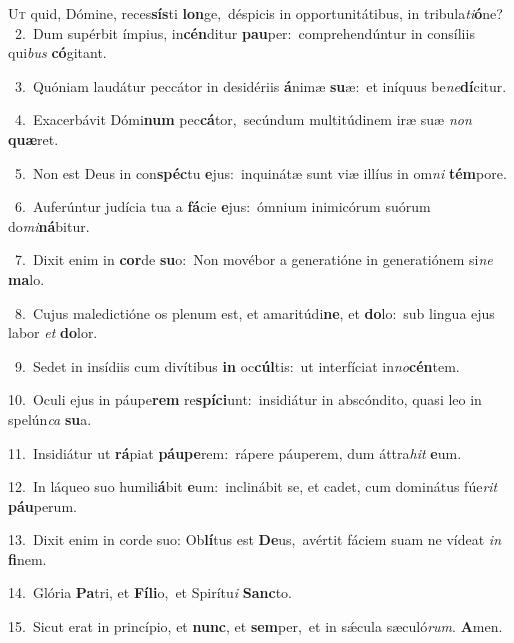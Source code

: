 \lettrine{\initial\textcolor{\initialcolor}{U}}{t} quid, Dómine, reces\-\textbf{sís}\-ti \textbf{lon}\-ge,~\star déspicis in opportunitátibus, in tribula\-\textit{ti}\-\textbf{ó}ne?\\
{\numbfont\textcolor{\numbcolor}{~2.}}~Dum supérbit ímpius, in\-\textbf{cén}\-ditur \textbf{pau}\-per:~\star comprehendúntur in consíliis qui\textit{bus} \textbf{có}\-gitant.\par
{\numbfont\textcolor{\numbcolor}{~3.}}~Quóniam laudátur peccátor in desidériis \textbf{á}\-nimæ \textbf{su}\-æ:~\star et iníquus be\-\textit{ne}\-\textbf{dí}citur.\par
{\numbfont\textcolor{\numbcolor}{~4.}}~Exacerbávit Dómi\textbf{num} pec\-\textbf{cá}\-tor,~\star secúndum multitúdinem iræ suæ \textit{non} \textbf{quæ}\-ret.\par
{\numbfont\textcolor{\numbcolor}{~5.}}~Non est Deus in con\-\textbf{spéc}\-tu \textbf{e}\-jus:~\star inquinátæ sunt viæ illíus in om\textit{ni} \textbf{tém}\-pore.\par
{\numbfont\textcolor{\numbcolor}{~6.}}~Auferúntur judícia tua a \textbf{fá}\-cie \textbf{e}\-jus:~\star ómnium inimicórum suórum do\-\textit{mi}\-\textbf{ná}bitur.\par
{\numbfont\textcolor{\numbcolor}{~7.}}~Dixit enim in \textbf{cor}\-de \textbf{su}\-o:~\star Non movébor a generatióne in generatiónem si\textit{ne} \textbf{ma}\-lo.\par
{\numbfont\textcolor{\numbcolor}{~8.}}~Cujus maledictióne os plenum est, et amaritúdi\-\textbf{ne}\-, et \textbf{do}\-lo:~\star sub lingua ejus labor \textit{et} \textbf{do}\-lor.\par
{\numbfont\textcolor{\numbcolor}{~9.}}~Sedet in insídiis cum divítibus \textbf{in} oc\-\textbf{cúl}\-tis:~\star ut interfíciat in\-\textit{no}\-\textbf{cén}tem.\par
{\numbfont\textcolor{\numbcolor}{10.}}~Oculi ejus in páupe\textbf{rem} re\-\textbf{spí}\-\textbf{ci}unt:~\star insidiátur in abscóndito, quasi leo in spelún\textit{ca} \textbf{su}\-a.\par
{\numbfont\textcolor{\numbcolor}{11.}}~Insidiátur ut \textbf{rá}\-piat \textbf{páu}\-\textbf{pe}rem:~\star rápere páuperem, dum áttra\textit{hit} \textbf{e}\-um.\par
{\numbfont\textcolor{\numbcolor}{12.}}~In láqueo suo humili\-\textbf{á}\-bit \textbf{e}\-um:~\star inclinábit se, et cadet, cum dominátus fúe\textit{rit} \textbf{páu}\-perum.\par
{\numbfont\textcolor{\numbcolor}{13.}}~Dixit enim in corde suo: Ob\-\textbf{lí}\-tus est \textbf{De}\-us,~\star avértit fáciem suam ne vídeat \textit{in} \textbf{fi}\-nem.\par
{\numbfont\textcolor{\numbcolor}{14.}}~Glória \textbf{Pa}\-tri, et \textbf{Fí}\-\textbf{li}o,~\star et Spirítu\textit{i} \textbf{Sanc}\-to.\par
{\numbfont\textcolor{\numbcolor}{15.}}~Sicut erat in princípio, et \textbf{nunc}\-, et \textbf{sem}\-per,~\star et in sǽcula sæculó\-\textit{rum}\-. \textbf{A}\-men.\par
